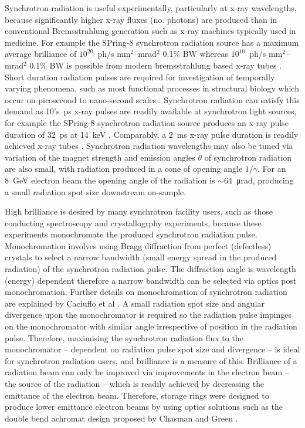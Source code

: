 \documentclass[../main.tex]{subfiles}
\begin{document}
Synchrotron radiation is useful experimentally, particularly at x-ray wavelengths, because significantly higher x-ray fluxes (no. photons) are produced than in conventional Bremsstrahlung generation such as x-ray machines typically used in medicine. For example the SPring-8 synchrotron radiation source has a maximum average brilliance of $10^{20}$~ph/\si{\second} \si{\milli\meter}$^{2}$--\si{\milli\radian}$^{2}$ 0.1\% BW \cite{spring8beamlines} whereas $10^{10}$~ph/\si{\second} \si{\milli\meter}$^{2}$--\si{\milli\radian}$^{2}$ 0.1\% BW is possible from modern bremsstrahlung based x-ray tubes \cite{behling2018diagnostic}. Short duration radiation pulses are required for investigation of temporally varying phenomena, such as most functional processes in structural biology which occur on picosecond to nano-second scales \cite{burnett2020uk}. Synchrotron radiation can satisfy this demand as 10's~\si{\pico\second} x-ray pulses are readily available at synchrotron light sources, for example the SPring-8 synchrotron radiation source produces an x-ray pulse duration of 32~\si{\pico\second} at 14~\si{\kilo\electronvolt} \cite{tanaka2001field}. Comparably, a 2~\si{\milli\second} x-ray pulse duration is readily achieved x-ray tubes \cite{behling2018diagnostic}. Synchrotron radiation wavelengths may also be tuned via variation of the magnet strength and emission angles $\theta$ of synchrotron radiation are also small, with radiation produced in a cone of opening angle $1/\gamma$. For an 8~\si{\giga\electronvolt} electron beam the opening angle of the radiation is $\sim 64$~\si{\micro\radian}, producing a small radiation spot size downstream on-sample.        

High brilliance is desired by many synchrotron facility users, such as those conducting spectroscopy and crystallogrphy experiments, because these experiments monochromate the produced synchrotron radiation pulse. Monochromation involves using Bragg diffraction from perfect (defectless) crystals to select a narrow bandwidth (small energy spread in the produced radiation) of the synchrotron radiation pulse. The diffraction angle is wavelength (energy) dependent therefore a narrow bandwidth can be selected via optics post monochromation. Further details on monochromation of synchrotron radiation are explained by Caciuffo et al \cite{caciuffo1987monochromators}. A small radiation spot size and angular divergence upon the monochromator is required so the radiation pulse impinges on the monochromator with similar angle irrespective of position in the radiation pulse. Therefore, maximising the synchrotron radiation flux to the monochromator -- dependent on radiation pulse spot size and divergence -- is ideal for synchrotron radiation users, and brilliance is a measure of this. Brilliance of a radiation beam can only be improved via improvements in the electron beam -- the source of the radiation -- which is readily achieved by decreasing the emittance of the electron beam. Therefore, storage rings were designed to produce lower emittance electron beams by using optics solutions such as the double bend achromat design proposed by Chasman and Green \cite{chasman1975preliminary}.          
\end{document}
